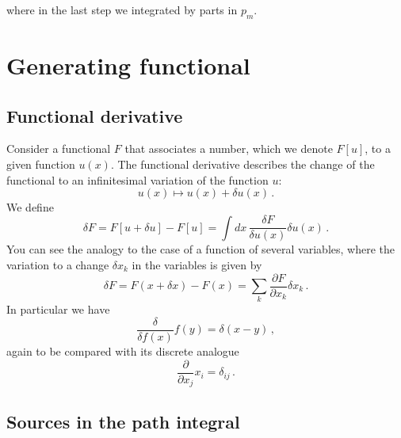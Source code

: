 where in the last step we integrated by parts in $p_m$.

\section{Generating functional}
\label{sec:gener-funct}

\subsection{Functional derivative}
\label{sec:funct-deriv}

Consider a functional $F$ that associates a number, which we denote
$F[u]$, to a given function $u(x)$. The functional derivative
describes the change of the functional to an infinitesimal variation
of the function $u$: 
\[
  u(x) \mapsto u(x) + \delta u(x)\, .
\]
We define
\begin{equation}
  \label{eq:FuncDer}
  \delta F = F[u+\delta u] - F[u] = \int dx\, \frac{\delta F}{\delta
    u(x)} \delta u(x)\, .
\end{equation}
You can see the analogy to the case of a function of several
variables, where the variation to a change $\delta x_k$ in the
variables is given by
\begin{equation}
  \label{eq:NormDer}
  \delta F = F(x+\delta x) - F(x) = \sum_k \frac{\partial F}{\partial
    x_k} \delta x_k\, .
\end{equation}
In particular we have
\begin{equation}
  \label{eq:DiracDelta}
  \frac{\delta}{\delta f(x)} f(y) = \delta(x-y)\, , 
\end{equation}
again to be compared with its discrete analogue
\begin{equation}
  \label{eq:KroneckerDelta}
  \frac{\partial}{\partial x_j} x_i = \delta_{ij}\, .
\end{equation}

\subsection{Sources in the path integral}
\label{sec:sourc-path-integr}

